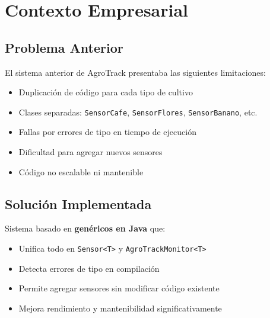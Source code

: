 \documentclass[12pt,a4paper]{article}
\begin{document}

\section{Contexto Empresarial}

\subsection{Problema Anterior}

El sistema anterior de AgroTrack presentaba las siguientes limitaciones:

\begin{tcolorbox}[colback=red!5,colframe=red!75!black,title=Problemas Identificados]
\begin{itemize}
    \item Duplicación de código para cada tipo de cultivo
    \item Clases separadas: \texttt{SensorCafe}, \texttt{SensorFlores}, \texttt{SensorBanano}, etc.
    \item Fallas por errores de tipo en tiempo de ejecución
    \item Dificultad para agregar nuevos sensores
    \item Código no escalable ni mantenible
\end{itemize}
\end{tcolorbox}

\subsection{Solución Implementada}

Sistema basado en \textbf{genéricos en Java} que:

\begin{tcolorbox}[colback=green!5,colframe=green!75!black,title=Solución Propuesta]
\begin{itemize}
    \item Unifica todo en \texttt{Sensor<T>} y \texttt{AgroTrackMonitor<T>}
    \item Detecta errores de tipo en compilación
    \item Permite agregar sensores sin modificar código existente
    \item Mejora rendimiento y mantenibilidad significativamente
\end{itemize}
\end{tcolorbox}
\end{document}
